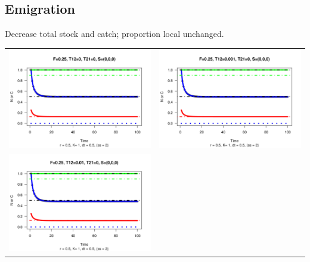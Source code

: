 \documentclass[a4paper,KOMA,landscape,titlepage]{powersem}
\begin{document}
\begin{slide}\section{Emigration}
\begin{center}
Decrease total stock and catch; proportion local unchanged.
\begin{tabular}{cc}
\includegraphics[height=0.35\textheight]{./graphics/r05F025T120T210S000.png}&
\includegraphics[height=0.35\textheight]{./graphics/r05F025T120001T210S000.png}\\
\includegraphics[height=0.35\textheight]{./graphics/r05F025T12001T210S000.png}&

\end{tabular}
\end{center}
\end{slide}
\end{document}
